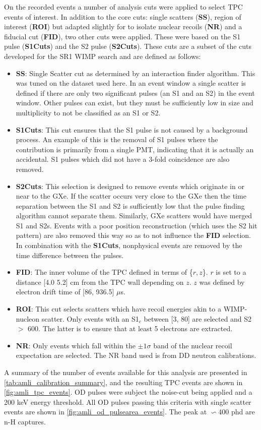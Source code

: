 \par
On the recorded events a number of analysis cuts were applied to select TPC events of interest.
In addition to the core cuts: single scatters (\textbf{SS}), region of interest (\textbf{ROI}) but adapted slightly for to isolate nuclear recoils (\textbf{NR}) and a fiducial cut (\textbf{FID}), two other cuts were applied.
These were based on the S1 pulse (\textbf{S1Cuts}) and the S2 pulse (\textbf{S2Cuts}).
These cuts are a subset of the cuts developed for the SR1 WIMP search \cite{lz_ws_sr1_ref} and are defined as follows:
\begin{itemize}
    \item \textbf{SS}: Single Scatter cut as determined by an interaction finder algorithm. This was tuned on the dataset used here. In an event window a single scatter is defined if there are only two significant pulses (an S1 and an S2) in the event window. Other pulses can exist, but they must be sufficiently low in size and multiplicity to not be classified as an S1 or S2.
    \item \textbf{S1Cuts}: This cut ensures that the S1 pulse is not caused by a background process. An example of this is the removal of S1 pulses where the contribution is primarily from a single PMT, indicating that it is actually an accidental. S1 pulses which did not have a 3-fold coincidence are also removed.
    \item \textbf{S2Cuts}: This selection is designed to remove events which originate in or near to the GXe. If the scatter occurs very close to the GXe then the time separation between the S1 and S2 is sufficiently low that the pulse finding algorithm cannot separate them. Similarly, GXe scatters would have merged S1 and S2s. Events with a poor position reconstruction (which uses the S2 hit pattern) are also removed this way so as to not influence the \textbf{FID} selection. In combination with the \textbf{S1Cuts}, nonphysical events are removed by the time difference between the pulses.
    \item \textbf{FID}: The inner volume of the TPC defined in terms of \{$r,z$\}. $r$ is set to a distance [4.0 5.2] cm from the TPC wall depending on $z$. $z$ was defined by electron drift time of [86, 936.5] $\mu$s.
    \item \textbf{ROI}: This cut selects scatters which have recoil energies akin to a WIMP-nucleon scatter. Only events with an S1$_c$ between [3, 80] are selected and S2 $>$ 600. The latter is to ensure that at least 5 electrons are extracted.
    \item \textbf{NR}: Only events which fall within the $\pm 1\sigma$ band of the nuclear recoil expectation are selected. The NR band used is from DD neutron calibrations.
\end{itemize}
A summary of the number of events available for this analysis are presented in \autoref{tab:amli_calibration_summary}, and the resulting TPC events are shown in 
\autoref{fig:amli_tpc_events}.
OD pulses were subject the noise-cut being applied and a 200 keV energy threshold.
All OD pulses passing this criteria with single scatter events are shown in \autoref{fig:amli_od_pulsearea_events}.
The peak at $\backsim$400 phd are n-H captures.

